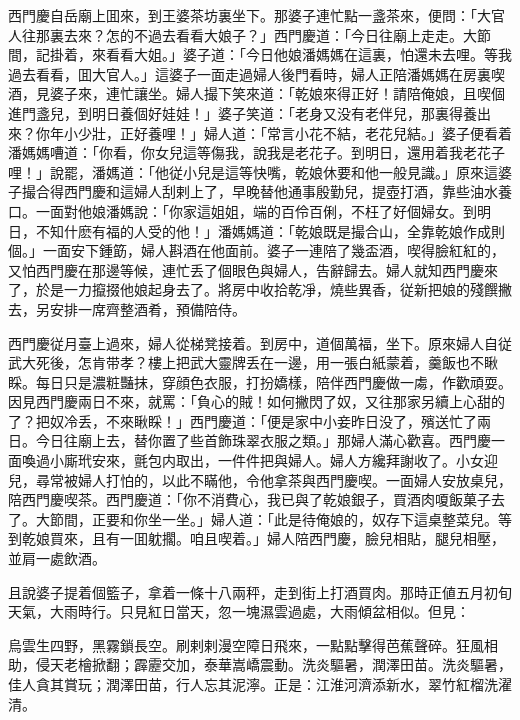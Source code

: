 西門慶自岳廟上囬來，到王婆茶坊裏坐下。那婆子連忙點一盞茶來，便問：「大官人往那裏去來？怎的不過去看看大娘子？」西門慶道：「今日往廟上走走。大節間，記掛着，來看看大姐。」婆子道：「今日他娘潘媽媽在這裏，怕還未去哩。等我過去看看，囬大官人。」這婆子一面走過婦人後門看時，婦人正陪潘媽媽在房裏喫酒，見婆子來，連忙讓坐。婦人撮下笑來道：「乾娘來得正好！請陪俺娘，且喫個進門盞兒，到明日養個好娃娃！」婆子笑道：「老身又没有老伴兒，那裏得養出來？你年小少壯，正好養哩！」婦人道：「常言小花不結，老花兒結。」婆子便看着潘媽媽嘈道：「你看，你女兒這等傷我，說我是老花子。到明日，還用着我老花子哩！」說罷，潘媽道：「他従小兒是這等快嘴，乾娘休要和他一般見識。」原來這婆子撮合得西門慶和這婦人刮剌上了，早晚替他通事殷勤兒，提壺打酒，靠些油水養口。一面對他娘潘媽說：「你家這姐姐，端的百伶百俐，不枉了好個婦女。到明日，不知什麽有福的人受的他！」潘媽媽道：「乾娘既是撮合山，全靠乾娘作成則個。」一面安下鍾筯，婦人斟酒在他面前。婆子一連陪了幾盃酒，喫得臉紅紅的，又怕西門慶在那邊等候，連忙丢了個眼色與婦人，告辭歸去。婦人就知西門慶來了，於是一力攛掇他娘起身去了。將房中收拾乾凈，燒些異香，従新把娘的殘饌撇去，另安排一席齊整酒肴，預備陪侍。

西門慶従月臺上過來，婦人從梯凳接着。到房中，道個萬福，坐下。原來婦人自従武大死後，怎肯带孝？樓上把武大靈牌丢在一邊，用一張白紙蒙着，羹飯也不瞅睬。每日只是濃粧豔抹，穿顔色衣服，打扮嬌樣，陪伴西門慶做一䖏，作歡頑耍。因見西門慶兩日不來，就罵：「負心的賊！如何撇閃了奴，又往那家另續上心甜的了？把奴冷丢，不來瞅睬！」西門慶道：「便是家中小妾昨日没了，殯送忙了兩日。今日往廟上去，替你置了些首飾珠翠衣服之類。」那婦人滿心歡喜。西門慶一面喚過小廝玳安來，氈包内取出，一件件把與婦人。婦人方纔拜謝收了。小女迎兒，尋常被婦人打怕的，以此不瞞他，令他拿茶與西門慶喫。一面婦人安放桌兒，陪西門慶喫茶。西門慶道：「你不消費心，我已與了乾娘銀子，買酒肉嗄飯菓子去了。大節間，正要和你坐一坐。」婦人道：「此是待俺娘的，奴存下這桌整菜兒。等到乾娘買來，且有一囬躭擱。咱且喫着。」婦人陪西門慶，臉兒相貼，腿兒相壓，並肩一處飲酒。

且說婆子提着個籃子，拿着一條十八兩秤，走到街上打酒買肉。那時正値五月初旬天氣，大雨時行。只見紅日當天，忽一塊濕雲過處，大雨傾盆相似。但見：
\begin{myquote}
烏雲生四野，黑霧鎖長空。刷剌剌漫空障日飛來，一點點擊得芭蕉聲碎。狂風相助，侵天老檜掀翻；霹靂交加，泰華嵩嶠震動。洗炎驅暑，潤澤田苗。洗炎驅暑，佳人貪其賞玩；潤澤田苗，行人忘其泥濘。正是：江淮河濟添新水，翠竹紅榴洗濯清。
\end{myquote}

